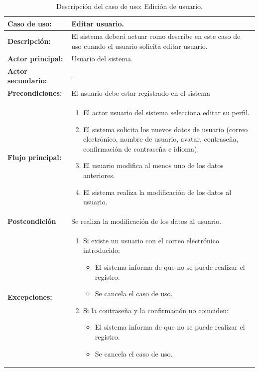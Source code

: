 \begin{table}[H]
  \begin{center}
    \begin{tabular}{|p{3.5cm}|p{10cm}|}
      \hline
      {\textbf{Caso de uso:}} & { Editar usuario.} \\
      \hline
      {\textbf{Descripción:}} & { El sistema deberá actuar como describe en este caso de uso cuando el usuario solicita editar usuario.} \\
     \hline
      {\textbf{Actor principal:}} & { Usuario del sistema.} \\
      \hline
      {\textbf{Actor secundario:}} & { - } \\
      \hline
      {\textbf{Precondiciones:}} & { El usuario debe estar registrado en el sistema } \\
     \hline   
    {\textbf{Flujo principal:}} & { 
      \begin{enumerate}
	\item El actor usuario del sistema selecciona editar su perfil.
	\item El sistema solicita los nuevos datos de usuario (correo electrónico, nombre de usuario, avatar, contraseña, confirmación de contraseña e idioma).
	\item El usuario modifica al menos uno de los datos anteriores.
	\item El sistema realiza la modificación de los datos al usuario.
      \end{enumerate}
      } \\
     \hline
     {\textbf{Postcondición}} & {Se realiza la modificación de los datos al usuario.}\\
     \hline
     
      {\textbf{Excepciones:}} & {
	\begin{enumerate}
	\item Si existe un usuario con el correo electrónico introducido:
	\begin{itemize}
	  \item El sistema informa de que no se puede realizar el registro.
	  \item Se cancela el caso de uso.
	\end{itemize}
	\item Si la contraseña y la confirmación no coinciden:
	  \begin{itemize}
	    \item El sistema informa de que no se puede realizar el registro.
	    \item Se cancela el caso de uso.
	  \end{itemize}
	\end{enumerate}
	}\\
      \hline
    \end{tabular}
  \end{center}
\caption{Descripción del caso de uso: Edición de usuario.}
\end{table}





